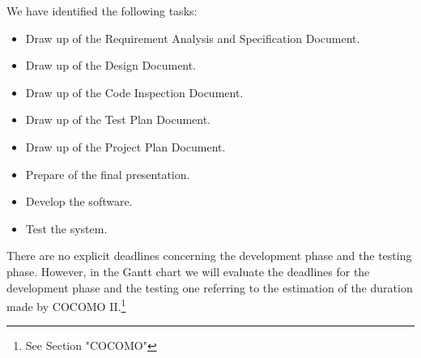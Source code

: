 We have identified the following tasks:
\begin{itemize}
    \item Draw up of the Requirement Analysis and Specification Document.
    \item Draw up of the Design Document.
    \item Draw up of the Code Inspection Document.
    \item Draw up of the Test Plan Document.
    \item Draw up of the Project Plan Document.
    \item Prepare of the final presentation.
    \item Develop the software.
    \item Test the system.
\end{itemize}

There are no explicit deadlines concerning the development phase and the testing phase. However, in the Gantt chart we will evaluate the deadlines for the development phase and the testing one referring to the estimation of the duration made by COCOMO II.\footnote{See Section "COCOMO"}
